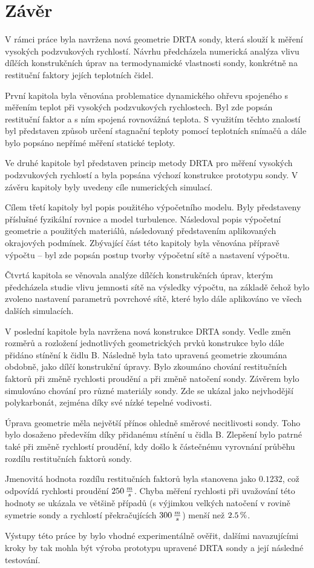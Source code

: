 \section*{Závěr}

V rámci práce byla navržena nová geometrie DRTA sondy, která slouží k měření vysokých podzvukových rychlostí. Návrhu předcházela numerická analýza vlivu dílčích konstrukčních úprav na termodynamické vlastnosti sondy, konkrétně na restituční faktory jejích teplotních čidel.

První kapitola byla věnována problematice dynamického ohřevu spojeného s měřením teplot při vysokých podzvukových rychlostech. Byl zde popsán restituční faktor a s ním spojená rovnovážná teplota. S využitím těchto znalostí byl představen způsob určení stagnační teploty pomocí teplotních snímačů a dále bylo popsáno nepřímé měření statické teploty.

Ve druhé kapitole byl představen princip metody DRTA pro měření vysokých podzvukových rychlostí a byla popsána výchozí konstrukce prototypu sondy. V závěru kapitoly byly uvedeny cíle numerických simulací.

Cílem třetí kapitoly byl popis použitého výpočetního modelu. Byly představeny příslušné fyzikální rovnice a model turbulence. Následoval popis výpočetní geometrie a použitých materiálů, následovaný představením aplikovaných okrajových podmínek. Zbývající část této kapitoly byla věnována přípravě výpočtu – byl zde popsán postup tvorby výpočetní sítě a nastavení výpočtu.

Čtvrtá kapitola se věnovala analýze dílčích konstrukčních úprav, kterým předcházela studie vlivu jemnosti sítě na výsledky výpočtu, na základě čehož bylo zvoleno nastavení parametrů povrchové sítě, které bylo dále aplikováno ve všech dalších simulacích. 

V poslední kapitole byla navržena nová konstrukce DRTA sondy. Vedle změn rozměrů a rozložení jednotlivých geometrických prvků konstrukce bylo dále přidáno stínění k čidlu B. Následně byla tato upravená geometrie zkoumána obdobně, jako dílčí konstrukční úpravy. Bylo zkoumáno chování restitučních faktorů při změně rychlosti proudění a při změně natočení sondy. Závěrem bylo simulováno chování pro různé materiály sondy. Zde se ukázal jako nejvhodější polykarbonát, zejména díky své nízké tepelné vodivosti. 

Úprava geometrie měla největší přínos ohledně směrové necitlivosti sondy. Toho bylo dosaženo především díky přidanému stínění u čidla B. Zlepšení bylo patrné také při změně rychlostí proudění, kdy došlo k částečnému vyrovnání průběhu rozdílu restitučních faktorů sondy. 

Jmenovitá hodnota rozdílu restitučních faktorů byla stanovena jako $0.1232$, což odpovídá rychlosti proudění $250 \, \frac{m}{s}$. Chyba měření rychlosti při uvažování této hodnoty se ukázala ve většině případů (s výjimkou velkých natočení v rovině symetrie sondy a rychlostí překračujících $300 \, \frac{m}{s}$) menší než $2.5 \, \%$.

Výstupy této práce by bylo vhodné experimentálně ověřit, dalšími navazujícími kroky by tak mohla být výroba prototypu upravené DRTA sondy a její následné testování. 